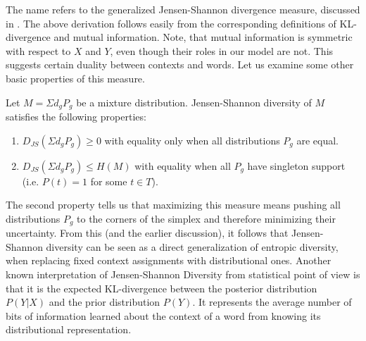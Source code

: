 The name refers to the generalized Jensen-Shannon divergence measure, 
discussed in \cite{FugledeTopsoe}. The above derivation follows easily
from the corresponding definitions of KL-divergence and mutual
information. Note, that mutual information is symmetric with respect
to $X$ and $Y$, even though their roles in our model are not. This
suggests certain duality between contexts and words. Let us examine
some other basic properties of this measure.

\bep\label{jsd-properties}
Let $M=\Sigma d_g P_g$ be a mixture distribution. Jensen-Shannon
diversity of $M$ satisfies the following properties:
 \begin{enumerate}
   \item $D_{JS}(\Sigma d_gP_g)\geq 0$ with equality only when all
     distributions $P_g$ are equal.
   \item $D_{JS}(\Sigma d_gP_g)\leq H(M)$ with equality when all
     $P_g$ have singleton support (i.e. $P(t)=1$ for some $t\in T$).
 \end{enumerate}
\eep
The second property tells us that maximizing this measure means
pushing all distributions $P_g$ to the corners of the simplex and
therefore minimizing their uncertainty.
From this (and the earlier discussion), it follows that Jensen-Shannon
diversity can be seen as a direct generalization of entropic
diversity, when replacing fixed context assignments 
with distributional ones. 
Another known interpretation of Jensen-Shannon Diversity from
statistical point of view is that it is the expected KL-divergence
between the posterior distribution $P(Y|X)$ and the prior distribution
$P(Y)$. It represents the average number of bits of information
learned about the context of a word from knowing its distributional
representation.